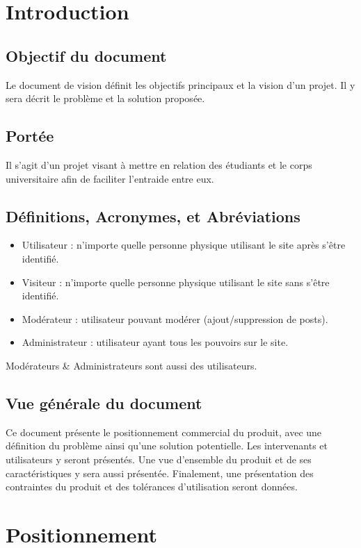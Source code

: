 
\section{Introduction}
\setcounter{section}{1}
\subsection{Objectif du document}
Le document de vision définit les objectifs principaux et la vision d’un projet. Il y sera décrit le problème et la solution proposée.
\subsection{Portée}
Il s’agit d’un projet visant à mettre en relation des étudiants et le corps universitaire afin de faciliter l’entraide entre eux.

\subsection{Définitions, Acronymes, et Abréviations}
\begin{itemize}
	\item Utilisateur : n’importe quelle personne physique utilisant le site après s’être identifié.
	\item Visiteur : n’importe quelle personne physique utilisant le site sans s’être identifié.
	\item Modérateur : utilisateur pouvant modérer (ajout/suppression de posts).
	\item Administrateur : utilisateur ayant tous les pouvoirs sur le site.

\end{itemize}

\noindent Modérateurs \& Administrateurs sont aussi des utilisateurs.

\subsection{Vue générale du document}
Ce document présente le positionnement commercial du produit, avec une définition du problème ainsi qu’une solution potentielle. Les intervenants et utilisateurs y seront présentés. Une vue d’ensemble du produit et de ses caractéristiques y sera aussi présentée. Finalement, une présentation des contraintes du produit et des tolérances d’utilisation seront données.



\section{Positionnement}
